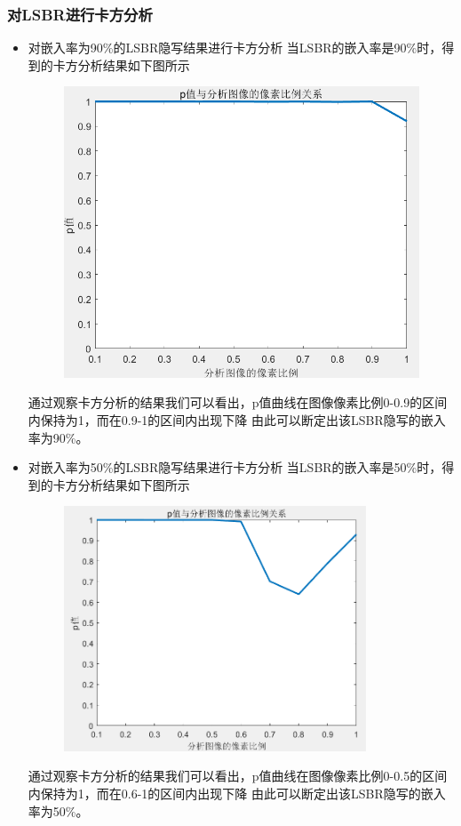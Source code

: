 \documentclass[a4paper,11pt,UTF8]{ctexart}
\newcommand{\bottomcaption}{%
\setlength{\abovecaptionskip}{6pt}%
\setlength{\belowcaptionskip}{6pt}%
\caption}
\newcommand{\xiaowuhao}{\fontsize{9pt}{\baselineskip}\selectfont}   %
\begin{document}
    \subsubsection{对LSBR进行卡方分析}
      \begin{itemize}
        \item 对嵌入率为90\%的LSBR隐写结果进行卡方分析
        当LSBR的嵌入率是90\%时，得到的卡方分析结果如下图所示
        \begin{figure}[H]
          \centering
          \includegraphics[width=11cm]{k2_LSBR_90.png}
          \bottomcaption{\xiaowuhao{对嵌入率为90\%的LSBR隐写图像卡方分析结果}}
        \end{figure}
        通过观察卡方分析的结果我们可以看出，p值曲线在图像像素比例0-0.9的区间内保持为1，而在0.9-1的区间内出现下降
        由此可以断定出该LSBR隐写的嵌入率为90\%。
\newpage
        \item 对嵌入率为50\%的LSBR隐写结果进行卡方分析
          当LSBR的嵌入率是50\%时，得到的卡方分析结果如下图所示
          \begin{figure}[H]
            \centering
            \includegraphics[width=9cm]{k2_LSBR_50.png}
            \bottomcaption{\xiaowuhao{对嵌入率为50\%的LSBR隐写图像卡方分析结果}}
          \end{figure}
          通过观察卡方分析的结果我们可以看出，p值曲线在图像像素比例0-0.5的区间内保持为1，而在0.6-1的区间内出现下降
          由此可以断定出该LSBR隐写的嵌入率为50\%。


\end{itemize}
\end{document}
